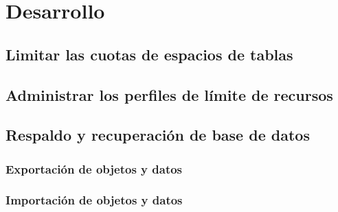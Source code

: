 \documentclass{extbook}
\begin{document}

\tableofcontents
\chapter{Desarrollo}
\section{Limitar las cuotas de espacios de tablas}

\section{Administrar los perfiles de límite de recursos}

\section{Respaldo y recuperación de base de datos}
\subsection{Exportación de objetos y datos}

\subsection{Importación de objetos y datos}

\end{document}
